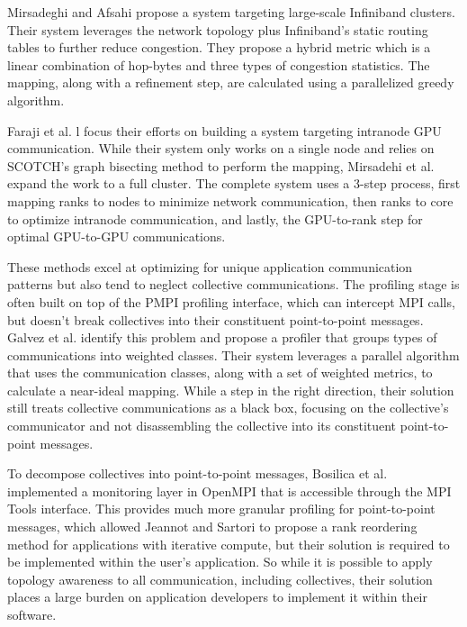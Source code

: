 Mirsadeghi and Afsahi \cite{Mirsadeghi2016PTRAM} propose a system targeting large-scale Infiniband clusters.
Their system leverages the network topology plus Infiniband's static routing tables to further reduce congestion.
They propose a hybrid metric which is a linear combination of hop-bytes and three types of congestion statistics. 
The mapping, along with a refinement step, are calculated using a parallelized greedy algorithm.

Faraji et al. l \cite{Faraji2016TopoAwareGPUSelection} focus their efforts on building a system targeting intranode GPU communication.
While their system only works on a single node and relies on SCOTCH's \cite{Pellegrini2012SCOTCH} graph bisecting method to perform the mapping, Mirsadehi et al. \cite{Mirsadeghi2016MAGC} expand the work to a full cluster.
The complete system uses a 3-step process, first mapping ranks to nodes to minimize network communication, then ranks to core to optimize intranode communication, and lastly, the GPU-to-rank step for optimal GPU-to-GPU communications.

These methods excel at optimizing for unique application communication patterns but also tend to neglect collective communications.
The profiling stage is often built on top of the PMPI profiling interface, which can intercept MPI calls, but doesn't break collectives into their constituent point-to-point messages.
Galvez et al. \cite{Galvez2017AutoTopoMap} identify this problem and propose a profiler that groups types of communications into weighted classes.
Their system leverages a parallel algorithm that uses the communication classes, along with a set of weighted metrics, to calculate a near-ideal mapping.
While a step in the right direction, their solution still treats collective communications as a black box, focusing on the collective's communicator and not disassembling the collective into its constituent point-to-point messages.

To decompose collectives into point-to-point messages, Bosilica et al. \cite{Bosilica2017OnlineMonitoringMPI} implemented a monitoring layer in OpenMPI that is accessible through the MPI Tools interface.
This provides much more granular profiling for point-to-point messages, which allowed Jeannot and Sartori \cite{Jeannot2020ImprvMPICommMonitoring} to propose a rank reordering method for applications with iterative compute, but their solution is required to be implemented within the user's application. 
So while it is possible to apply topology awareness to all communication, including collectives, their solution places a large burden on application developers to implement it within their software.

